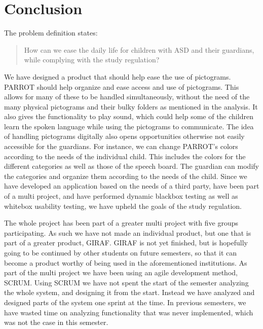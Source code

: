 \chapter{Conclusion}

The problem definition states:
\begin{quote}
How can we ease the daily life for children with ASD and their guardians, while complying with the study regulation?
\end{quote}

We have designed a product that should help ease the use of pictograms. 
PARROT should help organize and ease access and use of pictograms. This allows for many of these to be handled simultaneously, without the need of the many physical pictograms and their bulky folders as mentioned in the analysis.\newline
It also gives the functionality to play sound, which could help some of the children learn the spoken language while using the pictograms to communicate. 
The idea of handling pictograms digitally also opens opportunities otherwise not easily accessible for the guardians.
For instance, we can change PARROT's colors according to the needs of the individual child. This includes the colors for the different categories as well as those of the speech board.
The guardian can modify the categories and organize them according to the needs of the child.\newline
Since we have developed an application based on the needs of a third party, have been part of a multi project, and have performed dynamic blackbox testing as well as whitebox usability testing, we have upheld the goals of the study regulation.\newline

The whole project has been part of a greater multi project with five groups participating. 
As such we have not made an individual product, but one that is part of a greater product, GIRAF.  
GIRAF is not yet finished, but is hopefully going to be continued by other students on future semesters, so that it can become a product worthy of being used in the aforementioned institutions.\newline
As part of the multi project we have been using an agile development method, SCRUM.
Using SCRUM we have not spent the start of the semester analyzing the whole system, and designing it from the start. Instead we have analyzed and designed parts of the system one sprint at the time.
In previous semesters, we have wasted time on analyzing functionality that was never implemented, which was not the case in this semester.\newline
